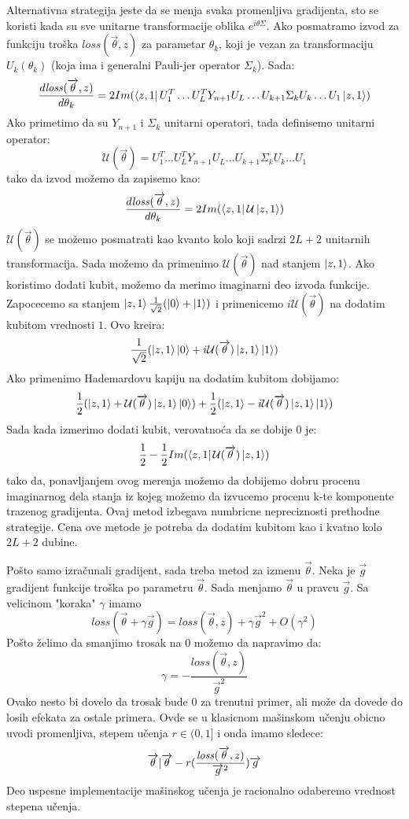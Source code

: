 \documentclass[12pt, letterpaper, oneside]{article}
\begin{document}
Alternativna strategija jeste da se menja svaka promenljiva gradijenta, sto se koristi kada su sve unitarne transformacije oblika $e^{i\theta\Sigma}$.
Ako posmatramo izvod za funkciju troška $\mathit{loss}(\overrightarrow{\theta},z)$ za parametar $\theta_k$, koji je vezan za transformaciju $U_k(\theta_k)$
(koja ima i generalni Pauli-jer operator $\Sigma_k$). Sada:
\[
    \frac{d\mathit{loss}(\overrightarrow{\theta},z)}{d\theta_k} = 2Im(\Bra{z,1}U_1^T \dots U_L^TY_{n+1}U_L \dots U_{k+1} \Sigma_k U_k \dots U_1 \Ket{z,1})
\]
Ako primetimo da su $Y_{n+1}$ i $\Sigma_k$ unitarni operatori, tada definisemo unitarni operator:
\[
    \mathcal{U}(\overrightarrow{\theta}) = U_1^T \dots U_L^TY_{n+1}U_L \dots U_{k+1} \Sigma_k U_k \dots U_1
\]
tako da izvod možemo da zapisemo kao:
\[
    \frac{d\mathit{loss}(\overrightarrow{\theta},z)}{d\theta_k} = 2Im(\Bra{z,1}\mathcal{U}\Ket{z,1})
\]
$\mathcal{U}(\overrightarrow{\theta})$ se možemo posmatrati kao kvanto kolo koji sadrzi $2L+2$ unitarnih transformacija.
Sada možemo da primenimo $\mathcal{U}(\overrightarrow{\theta})$ nad stanjem $\Ket{z,1}$. Ako koristimo dodati kubit, možemo da merimo imaginarni deo
izvoda funkcije. Zapocecemo sa stanjem $\Ket{z,1}\frac{1}{\sqrt{2}}(\Ket{0}+\Ket{1})$ i primenicemo $i\mathcal{U}(\overrightarrow{\theta})$ na dodatim kubitom vrednosti $1$.
Ovo kreira:
\[
    \frac{1}{\sqrt{2}}(\Ket{z,1}\Ket{0} + i\mathcal{U}(\overrightarrow{\theta})\Ket{z,1}\Ket{1})
\]
Ako primenimo Hademardovu kapiju na dodatim kubitom dobijamo:
\[
    \frac{1}{2}(\Ket{z,1}+\mathcal{U}(\overrightarrow{\theta})\Ket{z,1}\Ket{0}) + \frac{1}{2}(\Ket{z,1}-i\mathcal{U}(\overrightarrow{\theta})\Ket{z,1}\Ket{1})
\]
Sada kada izmerimo dodati kubit, verovatnoća da se dobije $0$ je:
\[
    \frac{1}{2} - \frac{1}{2}Im(\bra{z,1}\mathcal{U}(\overrightarrow{\theta})\Ket{z,1})
\]
tako da, ponavljanjem ovog merenja možemo da dobijemo dobru procenu imaginarnog dela stanja iz kojeg možemo da izvucemo procenu k-te komponente trazenog gradijenta.
Ovaj metod izbegava numbricne nepreciznosti prethodne strategije. Cena ove metode je potreba da dodatim kubitom kao i kvatno kolo $2L+2$ dubine.

Pošto samo izračunali gradijent, sada treba metod za izmenu $\overrightarrow{\theta}$. Neka je $\overrightarrow{g}$ gradijent funkcije troška po parametru $\overrightarrow{\theta}$.
Sada menjamo $\overrightarrow{\theta}$ u pravcu $\overrightarrow{g}$. Sa velicinom "koraka" $\gamma$ imamo
\[
    \mathit{loss}(\overrightarrow{\theta}+\gamma \overrightarrow{g}) = \mathit{loss}(\overrightarrow{\theta},z)+ \gamma \overrightarrow{g}^2 + O(\gamma^2)
\]
Pošto želimo da smanjimo trosak na $0$ možemo da napravimo da:
\[
    \gamma = -\frac{\mathit{loss}(\overrightarrow{\theta},z)}{\overrightarrow{g}^2}
\]
Ovako nesto bi dovelo da trosak bude $0$ za trenutni primer, ali može da dovede do losih efekata za ostale primera. 
Ovde se u klasicnom mašinskom učenju obicno uvodi promenljiva, stepem učenja $r \in (0,1]$ i onda imamo sledece:
\[
    \overrightarrow{\theta} \arrowvert \overrightarrow{\theta} - r(\frac{\mathit{loss}(\overrightarrow{\theta},z)}{\overrightarrow{g}^2})\overrightarrow{g}
\]
Deo uspesne implementacije mašinskog učenja je racionalno odaberemo vrednost stepena učenja.
\end{document}
